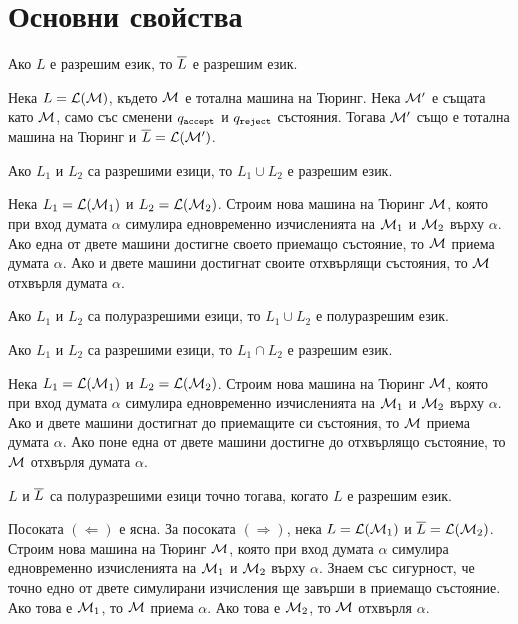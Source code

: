 \section{Основни свойства}

\begin{prop}
  Ако $L$ е разрешим език, то $\overline{L}$ е разрешим език.
\end{prop}
\begin{hint}
  Нека $L = \mathcal{L}(\mathcal{M})$, където $\mathcal{M}$ е тотална машина на Тюринг.
  Нека $\mathcal{M}'$ е същата като $\mathcal{M}$, само със сменени $q_{\texttt{accept}}$ и $q_{\texttt{reject}}$ състояния.
  Тогава $\mathcal{M}'$ също е тотална машина на Тюринг и $\overline{L} = \mathcal{L}(\mathcal{M}')$.
\end{hint}

\begin{prop}
  Ако $L_1$ и $L_2$ са разрешими езици, то $L_1 \cup L_2$ е разрешим език.
\end{prop}
\begin{hint}
  Нека $L_1 = \mathcal{L}(\mathcal{M}_1)$ и $L_2 = \mathcal{L}(\mathcal{M}_2)$.
  Строим нова машина на Тюринг $\mathcal{M}$, която при вход думата $\alpha$
  симулира едновременно изчисленията на $\mathcal{M}_1$ и $\mathcal{M}_2$ върху $\alpha$.
  Ако една от двете машини достигне своето приемащо състояние, то $\mathcal{M}$ приема думата $\alpha$.
  Ако и двете машини достигнат своите отхвърлящи състояния, то $\mathcal{M}$ отхвърля думата $\alpha$.
\end{hint}

\begin{prop}
  Ако $L_1$ и $L_2$ са полуразрешими езици, то $L_1 \cup L_2$ е полуразрешим език.
\end{prop}

\begin{prop}
  Ако $L_1$ и $L_2$ са разрешими езици, то $L_1 \cap L_2$ е разрешим език.
\end{prop}
\begin{hint}
  Нека $L_1 = \mathcal{L}(\mathcal{M}_1)$ и $L_2 = \mathcal{L}(\mathcal{M}_2)$.
  Строим нова машина на Тюринг $\mathcal{M}$, която при вход думата $\alpha$
  симулира едновременно изчисленията на $\mathcal{M}_1$ и $\mathcal{M}_2$ върху $\alpha$.
  Ако и двете машини достигнат до приемащите си състояния, то $\mathcal{M}$ приема думата $\alpha$.
  Ако поне една от двете машини достигне до отхвърлящо състояние, то $\mathcal{M}$ отхвърля думата $\alpha$.
\end{hint}

\begin{framed}
  \begin{thm}
    $L$ и $\overline{L}$ са полуразрешими езици точно тогава, когато $L$ е разрешим език.
  \end{thm}
\end{framed}
\begin{hint}
  Посоката $(\Leftarrow)$ е ясна.
  За посоката $(\Rightarrow)$, нека $L = \mathcal{L}(\mathcal{M}_1)$ и $\overline{L} = \mathcal{L}(\mathcal{M}_2)$.
  Строим нова машина на Тюринг $\mathcal{M}$, която при вход думата $\alpha$ симулира едновременно изчисленията на $\mathcal{M}_1$ и $\mathcal{M}_2$ върху $\alpha$.
  Знаем със сигурност, че точно едно от двете симулирани изчисления ще завърши в приемащо състояние.
  Ако това е $\mathcal{M}_1$, то $\mathcal{M}$ приема $\alpha$.
  Ако това е $\mathcal{M}_2$, то $\mathcal{M}$ отхвърля $\alpha$.
\end{hint}

